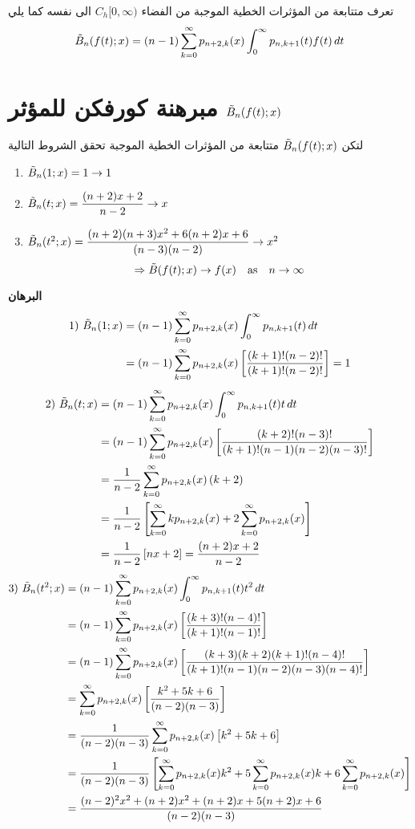 تعرف متتابعة من المؤثرات الخطية الموجبة من الفضاء $C_h[0, \infty)$ الى نفسه كما يلي
\[
\tilde{B}_n(f(t); x) = (n-1)\sum_{k=0}^{\infty} p_{n+2, k}(x) \int_{0}^{\infty} p_{n, k+1}(t) f(t) \, dt
\]

\section{مبرهنة كورفكن للمؤثر $\tilde{B}_n(f(t); x)$}
لتكن $\tilde{B}_n(f(t); x)$ متتابعة من المؤثرات الخطية الموجبة  تحقق الشروط التالية
\begin{english}
	\begin{enumerate}[label=\arabic*)]
		\item $\tilde{B}_n(1; x) = 1\to 1$
		\item $\tilde{B}_n(t; x) = \dfrac{(n+2)x+2}{n-2}\to x$
		\item $\tilde{B}_n(t^2; x) = \dfrac{(n+2)(n+3)x^2 + 6(n+2)x + 6}{(n-3)(n-2)}\to x^2$
		\[
		\Rightarrow \tilde{B}(f(t); x) \to f(x)\quad \text{as}\quad n \to \infty
		\]
	\end{enumerate}
\end{english}
\noindent
\textbf{البرهان}
\begin{align*}
1)\,\,\tilde{B}_n(1; x) &= (n-1)\sum_{k=0}^{\infty} p_{n+2, k}(x) \int_{0}^{\infty} p_{n, k+1}(t)  \, dt\\
&= (n-1) \sum_{k=0}^{\infty} p_{n+2, k}(x) \left[\frac{(k+1)!(n-2)!}{(k+1)!(n-2)!}\right] = 1
\end{align*}
\begin{align*}
2)\,\,\tilde{B}_n(t; x) &= (n-1)\sum_{k=0}^{\infty} p_{n+2, k}(x) \int_{0}^{\infty} p_{n, k+1}(t)  t\, dt\\
&= (n-1)\sum_{k=0}^{\infty} p_{n+2, k}(x) \left[\frac{(k+2)!(n-3)!}{(k+1)!(n-1)(n-2)(n-3)!}\right]\\
&= \frac{1}{n-2}\sum_{k=0}^{\infty} p_{n+2, k}(x)\, (k+2)\\
&= \frac{1}{n-2}\left[\sum_{k=0}^{\infty} kp_{n+2, k}(x) + 2\sum_{k=0}^{\infty} p_{n+2, k}(x)\right]\\
&=\frac{1}{n-2}\left[nx+2\right] = \frac{(n+2)x+2}{n-2}
\end{align*}
\begin{align*}
	3) \,\,\tilde{B}_n(t^2; x) &= (n-1)\sum_{k=0}^{\infty} p_{n+2, k}(x) \int_{0}^{\infty} p_{n, k+1}(t)  t^2\, dt\\
	&= (n-1)\sum_{k=0}^{\infty} p_{n+2, k}(x) \left[\frac{(k+3)!(n-4)!}{(k+1)!(n-1)!}\right]\\
	&= (n-1)\sum_{k=0}^{\infty} p_{n+2, k}(x)  \left[\frac{(k+3)(k+2)(k+1)!(n-4)!}{(k+1)!(n-1)(n-2)(n-3)(n-4)!}\right]\\
	&= \sum_{k=0}^{\infty} p_{n+2, k}(x) \left[\frac{k^2+5k+6}{(n-2)(n-3)}\right]\\
	&= \frac{1}{(n-2)(n-3)} \sum_{k=0}^{\infty} p_{n+2, k}(x) \left[k^2+5k+6\right]\\
	&= \frac{1}{(n-2)(n-3)} \left[\sum_{k=0}^{\infty} p_{n+2, k}(x) k^2+5\sum_{k=0}^{\infty} p_{n+2, k}(x)  k + 6\sum_{k=0}^{\infty} p_{n+2, k}(x) \right]\\
	&= \frac{(n-2)^2x^2 + (n+2)x^2 + (n+2)x + 5(n+2)x+6}{(n-2)(n-3)}
\end{align*}